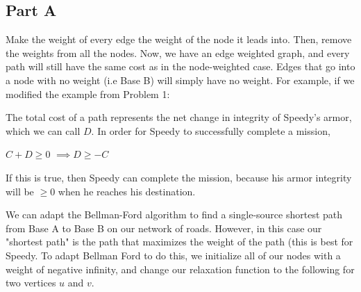 \documentclass[12pt,twoside]{article}
\begin{document}

\begin{problems}

\section*{Part A}

\problem  %

\begin{problemparts}
\problempart Make the weight of every edge the weight of the node it leads into. Then, remove the weights from all the nodes. Now, we have an edge weighted graph, and every path will still have the same cost as in the node-weighted case. Edges that go into a node with no weight (i.e Base B) will simply have no weight. For example, if we modified the example from Problem 1:



\problempart The total cost of a path represents the net change in integrity of Speedy's armor, which we can call $D$. In order for Speedy to successfully complete a mission, 

$C+D \geq 0$
$\implies D \geq - C$

\smallskip
If this is true, then Speedy can complete the mission, because his armor integrity will be $\geq 0 $ when he reaches his destination.

We can adapt the Bellman-Ford algorithm to find a single-source shortest path from Base A to Base B on our network of roads. However, in this case our "shortest path" is the path that maximizes the weight of the path (this is best for Speedy. To adapt Bellman Ford to do this, we initialize all of our nodes with a weight of negative infinity, and change our relaxation function to the following for two vertices $u$ and $v$. \\


\end{problemparts}
\end{problems}
\end{document}
